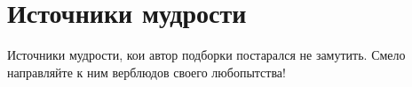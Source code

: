 \documentclass[nobib]{tufte-handout}
\begin{document}

\section{Источники мудрости}

Источники мудрости, кои автор подборки постарался не замутить. Смело направляйте к ним верблюдов своего любопытства!

\nocite{*}

\printbibliography
\end{document}
